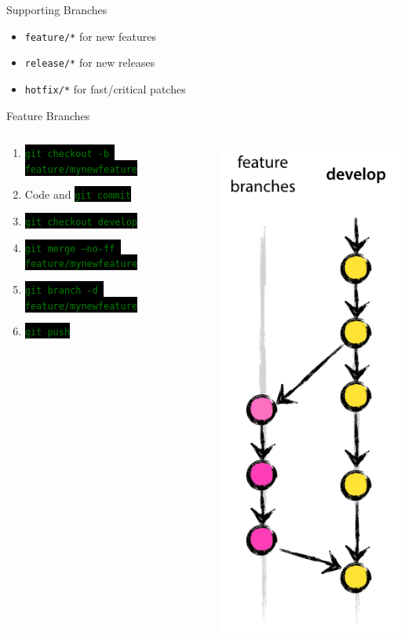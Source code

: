 \documentclass[
14pt,
aspectratio=169,
usenames,
dvipsnames,
x11names]{beamer}
\newcommand{\code}[1]{{\small\colorbox{black}{\textcolor{green}{\texttt{#1}}}}}
\begin{document}
\begin{frame}{Supporting Branches}
  \begin{itemize} \setlength{\itemsep}{\fill}
  \item \alert{\texttt{feature/*}} for new features
  \item \alert{\texttt{release/*}} for new releases
  \item \alert{\texttt{hotfix/*}} for fast/critical patches
  \end{itemize}
\end{frame}

\begin{frame}{Feature Branches}
  \begin{columns}
    \begin{column}{.65\linewidth}
      \minipage[c][0.75\textheight][s]{\columnwidth}
      \begin{enumerate} \setlength{\itemsep}{\fill}
      \item \code{git checkout -b feature/mynewfeature}
      \item Code and \code{git commit}
      \item \code{git checkout develop}
      \item \code{git merge --no-ff feature/mynewfeature}
      \item \code{git branch -d feature/mynewfeature}
      \item \code{git push}
      \end{enumerate}
      \endminipage
    \end{column}
    \begin{column}{.35\linewidth}
      \centering
      \includegraphics[width=.48\textwidth]{feature-branch}

\end{column}
\end{columns}
\end{frame}
\end{document}
